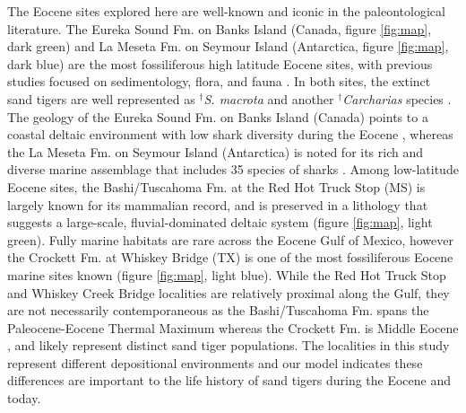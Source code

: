 \documentclass[]{rsos}%
\begin{document}
The Eocene sites explored here are well-known and iconic in the paleontological literature. 
The Eureka Sound Fm. on Banks Island (Canada, figure \ref{fig:map}, dark green) and La Meseta Fm. on Seymour Island (Antarctica, figure \ref{fig:map}, dark blue) are the most fossiliferous high latitude Eocene sites, with previous studies focused on sedimentology, flora, and fauna \cite{greenwood2010wet,cantrill2012vegetation, Reguero2012, miall1986eureka, eberle2012life, marenssi2002provenance}.
In both sites, the extinct sand tigers are well represented as ${}^\dag$\emph{S. macrota} and another ${}^\dag$\emph{Carcharias} species \cite{Padilla2014, Kriwet2016}. %
The geology of the Eureka Sound Fm. on Banks Island (Canada) points to a coastal deltaic environment with low shark diversity during the Eocene \cite{Padilla2014}, whereas the La Meseta Fm. on Seymour Island (Antarctica) is noted for its rich and diverse marine assemblage that includes 35 species of sharks \cite{Kriwet2016}.
Among low-latitude Eocene sites, the Bashi/Tuscahoma Fm. at the Red Hot Truck Stop (MS) is largely known for its mammalian record, and is preserved in a lithology that suggests a large-scale, fluvial-dominated deltaic system \cite{Beard2009, beard2008oldest, ingram1991tuscahoma} (figure \ref{fig:map}, light green).
Fully marine habitats are rare across the Eocene Gulf of Mexico, however the Crockett Fm. at Whiskey Bridge (TX) is one of the most fossiliferous Eocene marine sites known \cite{Flis2017}(figure \ref{fig:map}, light blue).
While the Red Hot Truck Stop and Whiskey Creek Bridge localities are relatively proximal along the Gulf, they are not necessarily contemporaneous as the Bashi/Tuscahoma Fm. spans the Paleocene-Eocene Thermal Maximum \cite{beard2008oldest, Beard2009} whereas the Crockett Fm. is Middle Eocene \cite{Flis2017}, and likely represent distinct sand tiger populations.
The localities in this study represent different depositional environments and our model indicates these differences are important to the life history of sand tigers during the Eocene and today.
\end{document}
